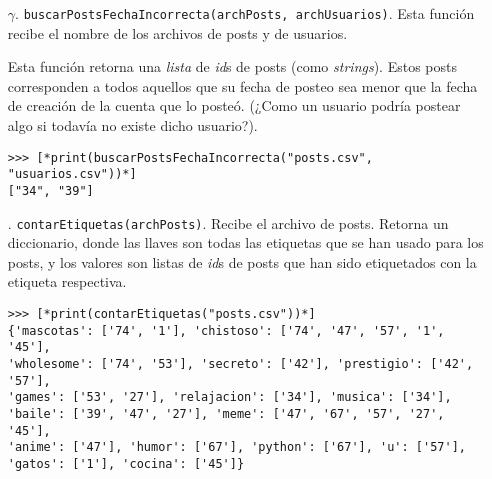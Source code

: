 \begin{enumerate}

    \item[$\gamma$.] \texttt{buscarPostsFechaIncorrecta(archPosts, archUsuarios)}. Esta función recibe el nombre de los archivos de posts y de usuarios.

    Esta función retorna una \textit{lista} de \textit{id}s de posts (como \textit{strings}). Estos posts corresponden a todos aquellos que su fecha de posteo sea menor que la fecha de creación de la cuenta que lo posteó. (¿Como un usuario podría postear algo si todavía no existe dicho usuario?).

    \begin{lstlisting}[style=consola]
>>> [*print(buscarPostsFechaIncorrecta("posts.csv", "usuarios.csv"))*]
["34", "39"]
    \end{lstlisting}

    \item[\textbullet.] \texttt{contarEtiquetas(archPosts)}. Recibe el archivo de posts. Retorna un diccionario, donde las llaves son todas las etiquetas que se han usado para los posts, y los valores son listas de \textit{id}s de posts que han sido etiquetados con la etiqueta respectiva.

    \begin{lstlisting}[style=consola]
>>> [*print(contarEtiquetas("posts.csv"))*]
{'mascotas': ['74', '1'], 'chistoso': ['74', '47', '57', '1', '45'], 
'wholesome': ['74', '53'], 'secreto': ['42'], 'prestigio': ['42', '57'], 
'games': ['53', '27'], 'relajacion': ['34'], 'musica': ['34'], 
'baile': ['39', '47', '27'], 'meme': ['47', '67', '57', '27', '45'], 
'anime': ['47'], 'humor': ['67'], 'python': ['67'], 'u': ['57'], 
'gatos': ['1'], 'cocina': ['45']}
    \end{lstlisting}

\end{enumerate}
